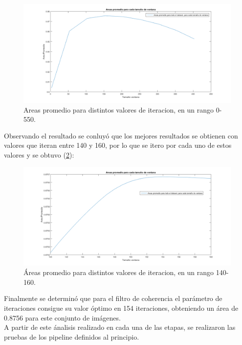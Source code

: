\begin{figure}[H]
	{
	\centering
	\includegraphics[width=1\textwidth]{Figures/CoherenciaRangoGrande}
	\caption[\'Area promedio del Filtro Cohernecia en el rango 0-550]{Areas promedio para distintos valores de iteracion, en un rango 0-550.}
	\label{fig:coherencia}
	}
\end{figure}

Observando el resultado se conluy\'o que los mejores resultados se obtienen con valores que iteran entre 140 y 160, por lo que se itero por cada uno de estos valores y se obtuvo (\ref{fig:coherenciaRangoChico}):

\begin{figure}[H]
	{
	\centering
	\includegraphics[width=1\textwidth]{Figures/CoherenciaRangoChico}
	\caption[\'Area promedio del filtro de coherencia en el rango 140-160]{\'Areas promedio para distintos valores de iteracion, en un rango 140-160.}
	\label{fig:coherenciaRangoChico}
	}
\end{figure}

Finalmente se determin\'o que para el filtro de coherencia el parámetro de iteraciones consigue su valor \'optimo en 154 iteraciones, obteniendo un área de 0.8756 para este conjunto de im\'agenes.\\

A partir de este  \'analisis realizado en cada una de las etapas, se realizaron las pruebas de los pipeline definidos al principio. 


